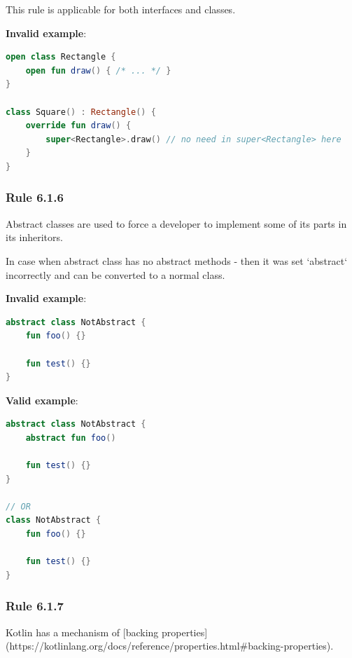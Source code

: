 {{{{This rule is applicable for both interfaces and classes.



\textbf{Invalid example}:

\begin{lstlisting}[language=Kotlin]
open class Rectangle {
    open fun draw() { /* ... */ }
}

class Square() : Rectangle() {
    override fun draw() {
        super<Rectangle>.draw() // no need in super<Rectangle> here
    }
}
\end{lstlisting}


\subsubsection*{\textbf{Rule 6.1.6}}
\leavevmode\newline

Abstract classes are used to force a developer to implement some of its parts in its inheritors.

In case when abstract class has no abstract methods - then it was set `abstract` incorrectly and can be converted to a normal class.



\textbf{Invalid example}:

\begin{lstlisting}[language=Kotlin]
abstract class NotAbstract {
    fun foo() {}
    
    fun test() {}
}
\end{lstlisting}


\textbf{Valid example}:

\begin{lstlisting}[language=Kotlin]
abstract class NotAbstract {
    abstract fun foo()
    
    fun test() {}
}

// OR
class NotAbstract {
    fun foo() {}
    
    fun test() {}
}
\end{lstlisting}




\subsubsection*{\textbf{Rule 6.1.7}}
\leavevmode\newline

Kotlin has a mechanism of [backing properties](https://kotlinlang.org/docs/reference/properties.html\#backing-properties).

}}}}

